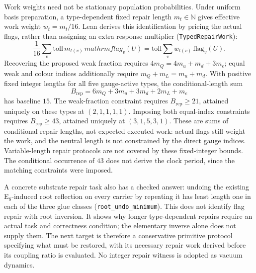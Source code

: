 Work weights need not be stationary population probabilities. Under uniform basis preparation, a type-dependent fixed repair length $m_t\in\mathbb N$ gives effective work weight $w_t=m_t/16$. Lean derives this identification by pricing the actual flags, rather than assigning an extra response multiplier (\texttt{TypedRepairWork}):
\begin{equation}
 \frac1{16}\sum_v \mathrm{toll}\,m_{t(v)}\,mathrm{flag}_v(U)
 =\mathrm{toll}\sum_v w_{t(v)}\,\mathrm{flag}_v(U).
\end{equation}
Recovering the proposed weak fraction requires $4m_Q=4m_u+m_d+3m_e$; equal weak and colour indices additionally require $m_Q+m_L=m_u+m_d$. With positive fixed integer lengths for all five gauge-active types, the conditional-length sum
\begin{equation}
 B_{\mathrm{rep}}=6m_Q+3m_u+3m_d+2m_L+m_e
\end{equation}
has baseline $15$. The weak-fraction constraint requires $B_{\mathrm{rep}}\ge21$, attained uniquely on these types at $(2,1,1,1,1)$. Imposing both equal-index constraints requires $B_{\mathrm{rep}}\ge43$, attained uniquely at $(3,1,5,3,1)$. These are sums of conditional repair lengths, not expected executed work: actual flags still weight the work, and the neutral length is not constrained by the direct gauge indices. Variable-length repair protocols are not covered by these fixed-integer bounds. The conditional occurrence of $43$ does not derive the clock period, since the matching constraints were imposed.

A concrete substrate repair task also has a checked answer: undoing the existing E$_8$-induced root reflection on every carrier by repeating it has least length one in each of the three glue classes (\texttt{root\_undo\_minimum}). This does not identify flag repair with root inversion. It shows why longer type-dependent repairs require an actual task and correctness condition; the elementary inverse alone does not supply them. The next target is therefore a conservative primitive protocol specifying what must be restored, with its necessary repair work derived before its coupling ratio is evaluated. No integer repair witness is adopted as vacuum dynamics.

